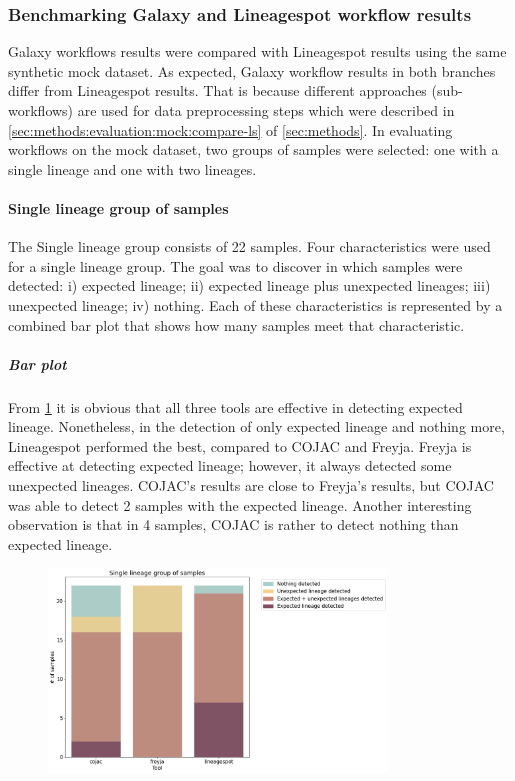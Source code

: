         \subsubsection{Benchmarking Galaxy and Lineagespot workflow results}
        Galaxy workflows results were compared with Lineagespot results using the same synthetic mock dataset. As expected, Galaxy workflow results in both branches differ from Lineagespot results. That is because different approaches (sub-workflows) are used for data preprocessing steps which were described in \autoref{sec:methods:evaluation:mock:compare-ls} of \cref{sec:methods}. In evaluating workflows on the mock dataset, two groups of samples were selected: one with a single lineage and one with two lineages.
            \paragraph{Single lineage group of samples}
            The Single lineage group consists of 22 samples. Four characteristics were used for a single lineage group. The goal was to discover in which samples were detected: i) expected lineage; ii) expected lineage plus unexpected lineages; iii) unexpected lineage; iv) nothing. Each of these characteristics is represented by a combined bar plot that shows how many samples meet that characteristic.
                \subparagraph{Bar plot}
                From \cref{fig:results:mock:bar-singlin} it is obvious that all three tools are effective in detecting expected lineage. Nonetheless, in the detection of only expected lineage and nothing more, Lineagespot performed the best, compared to COJAC and Freyja. Freyja is effective at detecting expected lineage; however, it always detected some unexpected lineages. COJAC's results are close to Freyja's results, but COJAC was able to detect 2 samples with the expected lineage. Another interesting observation is that in 4 samples, COJAC is rather to detect nothing than expected lineage. 
                \begin{figure}[ht!]
                	\centering
                    \includegraphics[width=0.8\textwidth]{figures/results/mock/singlin-num-bars.png}
                    \label{fig:results:mock:bar-singlin}
                \end{figure}
